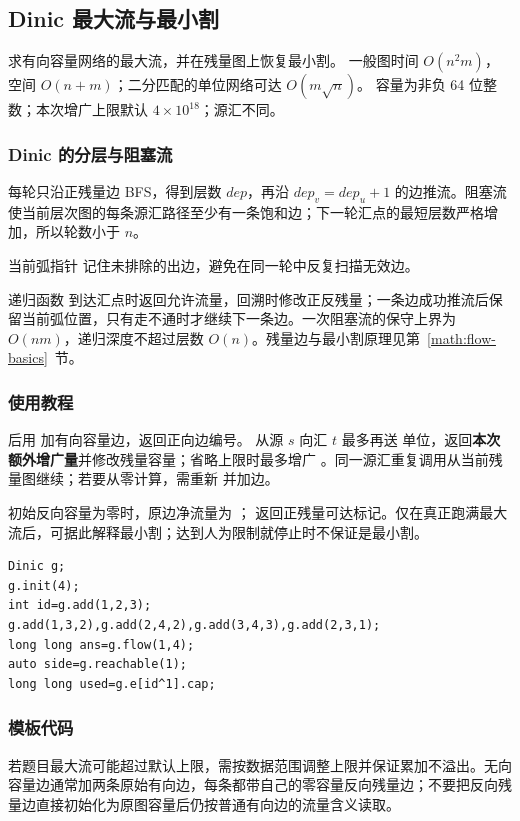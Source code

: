 \subsection{Dinic 最大流与最小割}
\label{algo:dinic}
\AlgorithmInfo
    {求有向容量网络的最大流，并在残量图上恢复最小割。}
    {一般图时间 $O(n^2m)$，空间 $O(n+m)$；二分匹配的单位网络可达 $O(m\sqrt n)$。}
    {容量为非负 64 位整数；本次增广上限默认 $4\times10^{18}$；源汇不同。}

\subsubsection*{Dinic 的分层与阻塞流}
每轮只沿正残量边 BFS，得到层数 $dep$，再沿 $dep_v=dep_u+1$ 的边推流。阻塞流使当前层次图的每条源汇路径至少有一条饱和边；下一轮汇点的最短层数严格增加，所以轮数小于 $n$。

当前弧指针  记住未排除的出边，避免在同一轮中反复扫描无效边。

递归函数  到达汇点时返回允许流量，回溯时修改正反残量；一条边成功推流后保留当前弧位置，只有走不通时才继续下一条边。一次阻塞流的保守上界为 $O(nm)$，递归深度不超过层数 $O(n)$。残量边与最小割原理见第~\ref{math:flow-basics}~节。

\subsubsection*{使用教程}
 后用  加有向容量边，返回正向边编号。 从源 $s$ 向汇 $t$ 最多再送  单位，返回\textbf{本次额外增广量}并修改残量容量；省略上限时最多增广 。同一源汇重复调用从当前残量图继续；若要从零计算，需重新  并加边。

初始反向容量为零时，原边净流量为 ； 返回正残量可达标记。仅在真正跑满最大流后，可据此解释最小割；达到人为限制就停止时不保证是最小割。
\begin{lstlisting}[style=mtycpp,numbers=none]
Dinic g;
g.init(4);
int id=g.add(1,2,3);
g.add(1,3,2),g.add(2,4,2),g.add(3,4,3),g.add(2,3,1);
long long ans=g.flow(1,4);
auto side=g.reachable(1);
long long used=g.e[id^1].cap;
\end{lstlisting}

\subsubsection*{模板代码}

若题目最大流可能超过默认上限，需按数据范围调整上限并保证累加不溢出。无向容量边通常加两条原始有向边，每条都带自己的零容量反向残量边；不要把反向残量边直接初始化为原图容量后仍按普通有向边的流量含义读取。
